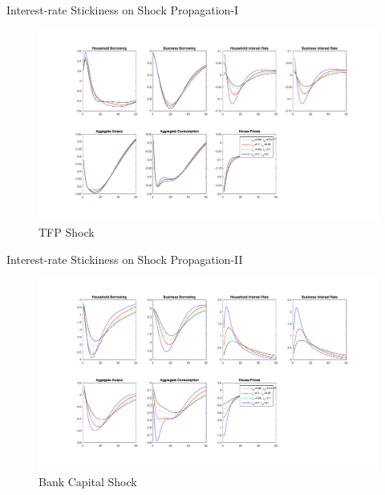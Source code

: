 \documentclass[8pt,aspectratio=169]{beamer}
\numberwithin{equation}{section}
\begin{document}
\begin{frame}{Interest-rate Stickiness on Shock Propagation-I}



\begin{figure}[H]
\centering
\caption{TFP Shock}
\includegraphics[scale=0.3]{stickinessA.pdf}
\end{figure}



\end{frame}



\begin{frame}{Interest-rate Stickiness on Shock Propagation-II}



\begin{figure}[H]
\centering
\caption{Bank Capital Shock}
\includegraphics[scale=0.3]{stickinessCAB.pdf}
\end{figure}



\end{frame}
\end{document}
